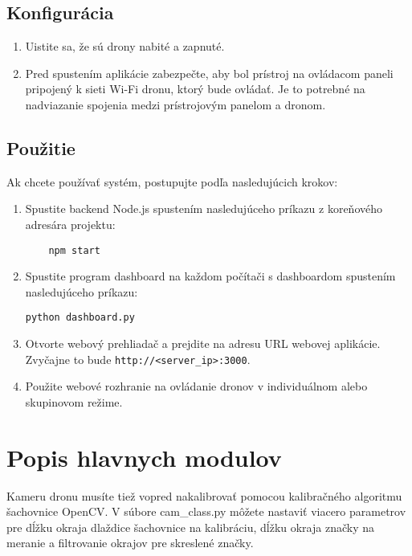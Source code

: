\documentclass[a4paper]{feidipsp}
\begin{document}
\subsection{Konfigurácia}

\begin{enumerate}
    \item Uistite sa, že sú drony nabité a zapnuté.
    \item Pred spustením aplikácie zabezpečte, aby bol prístroj na ovládacom paneli pripojený k sieti Wi-Fi dronu, ktorý bude ovládať. Je to potrebné na nadviazanie spojenia medzi prístrojovým panelom a dronom.
\end{enumerate}

\subsection{Použitie}
Ak chcete používať systém, postupujte podľa nasledujúcich krokov:

\begin{enumerate}
    \item Spustite backend Node.js spustením nasledujúceho príkazu z koreňového adresára projektu:
    
    \begin{verbatim}
    npm start
    \end{verbatim}

    \item Spustite program dashboard na každom počítači s dashboardom spustením nasledujúceho príkazu:
    
\begin{verbatim}
python dashboard.py
\end{verbatim}

\item Otvorte webový prehliadač a prejdite na adresu URL webovej aplikácie. Zvyčajne to bude \texttt{http://<server\_ip>:3000}.
\item Použite webové rozhranie na ovládanie dronov v individuálnom alebo skupinovom režime.
\end{enumerate}

\section{Popis hlavnych modulov}

Kameru dronu musíte tiež vopred nakalibrovať pomocou kalibračného algoritmu šachovnice OpenCV. V súbore cam\_class.py môžete nastaviť viacero parametrov pre dĺžku okraja dlaždice šachovnice na kalibráciu, dĺžku okraja značky na meranie a filtrovanie okrajov pre skreslené značky.
\end{document}
